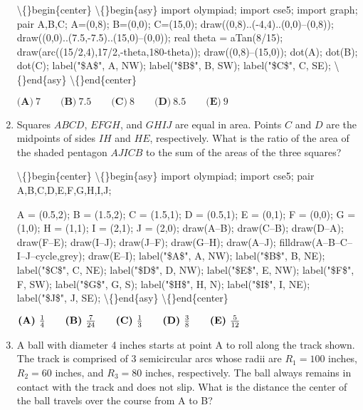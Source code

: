 \documentclass{article}
\begin{document}
\begin{enumerate}[label=\arabic*., itemsep=0.5em]
\textbackslash\{\}begin\{center\}
\textbackslash\{\}begin\{asy\}
import olympiad;
import cse5;
import graph;
pair A,B,C;
A=(0,8);
B=(0,0);
C=(15,0);
draw((0,8)..(-4,4)..(0,0)--(0,8));
draw((0,0)..(7.5,-7.5)..(15,0)--(0,0));
real theta = aTan(8/15);
draw(arc((15/2,4),17/2,-theta,180-theta));
draw((0,8)--(15,0));
dot(A);
dot(B);
dot(C);
label("\$A\$", A, NW);
label("\$B\$", B, SW);
label("\$C\$", C, SE);
\textbackslash\{\}end\{asy\}
\textbackslash\{\}end\{center\}


\(\textbf{(A)}\ 7 \qquad \textbf{(B)}\ 7.5 \qquad \textbf{(C)}\ 8 \qquad \textbf{(D)}\ 8.5 \qquad \textbf{(E)}\ 9\)\par \vspace{0.5em}\item Squares \(ABCD\), \(EFGH\), and \(GHIJ\) are equal in area. Points \(C\) and \(D\) are the midpoints of sides \(IH\) and \(HE\), respectively. What is the ratio of the area of the shaded pentagon \(AJICB\) to the sum of the areas of the three squares?


\textbackslash\{\}begin\{center\}
\textbackslash\{\}begin\{asy\}
import olympiad;
import cse5;
pair A,B,C,D,E,F,G,H,I,J;

A = (0.5,2);
B = (1.5,2);
C = (1.5,1);
D = (0.5,1);
E = (0,1);
F = (0,0);
G = (1,0);
H = (1,1);
I = (2,1);
J = (2,0); 
draw(A--B); 
draw(C--B); 
draw(D--A);  
draw(F--E); 
draw(I--J); 
draw(J--F); 
draw(G--H); 
draw(A--J); 
filldraw(A--B--C--I--J--cycle,grey);
draw(E--I);
label("\$A\$", A, NW);
label("\$B\$", B, NE);
label("\$C\$", C, NE);
label("\$D\$", D, NW);
label("\$E\$", E, NW);
label("\$F\$", F, SW);
label("\$G\$", G, S);
label("\$H\$", H, N);
label("\$I\$", I, NE);
label("\$J\$", J, SE);
\textbackslash\{\}end\{asy\}
\textbackslash\{\}end\{center\}



\( \textbf{(A)}\hspace{.05in}\frac{1}{4}\qquad\textbf{(B)}\hspace{.05in}\frac{7}{24}\qquad\textbf{(C)}\hspace{.05in}\frac{1}{3}\qquad\textbf{(D)}\hspace{.05in}\frac{3}{8}\qquad\textbf{(E)}\hspace{.05in}\frac{5}{12}\)\par \vspace{0.5em}\item A ball with diameter 4 inches starts at point A to roll along the track shown. The track is comprised of 3 semicircular arcs whose radii are \(R_1 = 100\) inches, \(R_2 = 60\) inches, and \(R_3 = 80\) inches, respectively. The ball always remains in contact with the track and does not slip. What is the distance the center of the ball travels over the course from A to B?



\end{enumerate}
\end{document}
